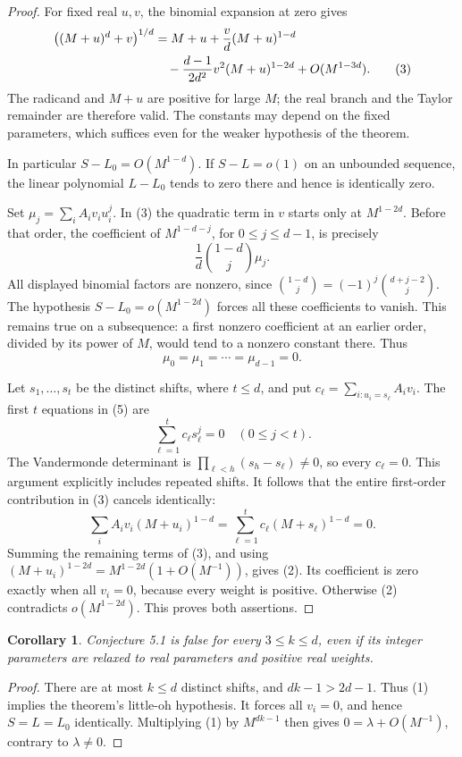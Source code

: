 \documentclass[11pt]{article}
\newtheorem{corollary}{Corollary}
\begin{document}
\begin{proof}
For fixed real \(u,v\), the binomial expansion at zero gives
\begin{align}
 \bigl((M+u)^d+v\bigr)^{1/d}
 &=M+u+\frac vd(M+u)^{1-d}\notag\\
 &\quad-\frac{d-1}{2d^2}v^2(M+u)^{1-2d}
       +O(M^{1-3d}).                                    \tag{3}
\end{align}
The radicand and \(M+u\) are positive for large \(M\);
the real branch and the Taylor remainder are therefore valid.
The constants may depend on the fixed parameters, which suffices
even for the weaker hypothesis of the theorem.

In particular \(S-L_0=O(M^{1-d})\). If \(S-L=o(1)\) on an
unbounded sequence, the linear polynomial \(L-L_0\) tends to zero
there and hence is identically zero.

Set \(\mu_j=\sum_i A_i v_i u_i^j\). In (3) the quadratic term in
\(v\) starts only at \(M^{1-2d}\). Before that order, the coefficient
of \(M^{1-d-j}\), for \(0\leq j\leq d-1\), is precisely
\[
 \frac1d\binom{1-d}{j}\mu_j.                             \tag{4}
\]
All displayed binomial factors are nonzero, since
\(\binom{1-d}{j}=(-1)^j\binom{d+j-2}{j}\).
The hypothesis \(S-L_0=o(M^{1-2d})\) forces all these coefficients
to vanish. This remains true on a subsequence: a first nonzero
coefficient at an earlier order, divided by its power of \(M\),
would tend to a nonzero constant there. Thus
\[
 \mu_0=\mu_1=\cdots=\mu_{d-1}=0.                         \tag{5}
\]

Let \(s_1,\ldots,s_t\) be the distinct shifts, where \(t\leq d\), and
put \(c_\ell=\sum_{i:u_i=s_\ell}A_i v_i\).
The first \(t\) equations in (5) are
\[
 \sum_{\ell=1}^t c_\ell s_\ell^j=0
       \quad(0\leq j<t).
\]
The Vandermonde determinant is
\(\prod_{\ell<h}(s_h-s_\ell)\ne0\), so every \(c_\ell=0\).
This argument explicitly includes repeated shifts.
It follows that the entire first-order contribution in (3)
cancels identically:
\[
 \sum_i A_i v_i(M+u_i)^{1-d}
       =\sum_{\ell=1}^t c_\ell(M+s_\ell)^{1-d}=0.         \tag{6}
\]
Summing the remaining terms of (3), and using
\((M+u_i)^{1-2d}=M^{1-2d}(1+O(M^{-1}))\), gives (2).
Its coefficient is zero exactly when all \(v_i=0\), because
every weight is positive. Otherwise (2) contradicts
\(o(M^{1-2d})\). This proves both assertions.
\end{proof}

\begin{corollary}
Conjecture 5.1 is false for every \(3\leq k\leq d\), even if its
integer parameters are relaxed to real parameters and positive
real weights.
\end{corollary}
\begin{proof}
There are at most \(k\leq d\) distinct shifts, and
\(dk-1>2d-1\). Thus (1) implies the theorem's little-oh
hypothesis. It forces all \(v_i=0\), and hence \(S=L=L_0\)
identically. Multiplying (1) by \(M^{dk-1}\) then gives
\(0=\lambda+O(M^{-1})\), contrary to \(\lambda\ne0\).
\end{proof}
\end{document}
